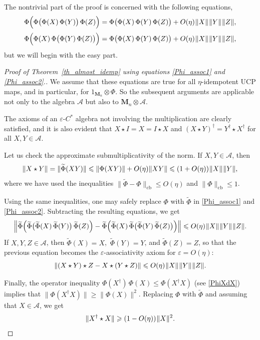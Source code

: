 \documentclass[12pt]{article}
\newcommand{\calA}{\mathcal{A}}
\newcommand{\ts}{\mkern1mu}
\newcommand{\cb}{\mathrm{cb}}
\newcommand{\wt}{\widetilde}
\newcommand*{\Ma}[1]{\mathbf{M}_{#1}}
\newcommand{\eps}{\varepsilon}
\renewcommand{\le}{\leqslant}
\renewcommand{\ge}{\geqslant}
\newtheorem[definition]{Definition}[Theorem]{Definition}
\newtheorem[remark]{Example}[Theorem]{Example}
\newtheorem[remark]{Remark}[Theorem]{Remark}
\newtheorem[remark]{Question}[Theorem]{Open question}
\newtheorem*[definition]{definition}{Definition}
\newtheorem*[remark]{example}{Example}
\newtheorem*[remark]{remark}{Remark}
\newtheorem*[remark]{question}{Open question}
\numberwithin{equation}{section}
\begin{document}
The nontrivial part of the proof is concerned with the following equations,
\begin{align}
\label{Phi_assoc1}
\Phi\Bigl(\Phi\bigl(\Phi(X)\,\Phi(Y)\bigr)\,\Phi(Z)\Bigr)
&=\Phi\bigl(\Phi(X)\,\Phi(Y)\,\Phi(Z)\bigr)+O(\eta)\ts\|X\|\ts\|Y\|\ts\|Z\|,
\\[2pt]
\label{Phi_assoc2}
\Phi\Bigl(\Phi(X)\,\Phi\bigl(\Phi(Y)\,\Phi(Z)\bigr)\Bigr)
&=\Phi\bigl(\Phi(X)\,\Phi(Y)\,\Phi(Z)\bigr)+O(\eta)\ts\|X\|\ts\|Y\|\ts\|Z\|,
\end{align}
but we will begin with the easy part.

\begin{proof}[Proof of Theorem~\ref{th_almost_idemp} using equations \eqref{Phi_assoc1} and \eqref{Phi_assoc2}.]
We assume that these equations are true for all $\eta$-idempotent UCP maps, and in particular, for $1_{\Ma{n}}\otimes\Phi$. So the subsequent arguments are applicable not only to the algebra $\calA$ but also to $\Ma{n}\otimes\calA$.

The axioms of an $\eps$-$C^*$ algebra not involving the multiplication are clearly satisfied, and it is also evident that $X\star I=X=I\star X$ and $(X\star Y)^\dag=Y^\dag\star X^\dag$ for all $X,Y\in\calA$.

Let us check the approximate submultiplicativity of the norm. If $X,Y\in\calA$, then
\begin{equation}
\|X\star Y\| =\|\wt{\Phi}(XY)\| \le\|\Phi(XY)\|+O(\eta)\|XY\|
\le (1+O(\eta))\ts\|X\|\ts\|Y\|,
\end{equation}
where we have used the inequalities $\|\wt{\Phi}-\Phi\|_\cb\le O(\eta)$ and $\|\Phi\|_\cb\le 1$.

Using the same inequalities, one may safely replace $\Phi$ with $\wt{\Phi}$ in \eqref{Phi_assoc1} and \eqref{Phi_assoc2}. Subtracting the resulting equations, we get
\[
\Bigl\|\wt{\Phi}\Bigl(\wt{\Phi}\bigl(\wt{\Phi}(X)\,\wt{\Phi}(Y)\bigr)\,
\wt{\Phi}(Z)\Bigr)
-\wt{\Phi}\Bigl(\wt{\Phi}(X)\,\wt{\Phi}\bigl(\wt{\Phi}(Y)\,
\wt{\Phi}(Z)\bigr)\Bigr)\Bigr\|
\le O(\eta)\ts\|X\|\ts\|Y\|\ts\|Z\|.
\]
If $X,Y,Z\in\calA$, then $\wt{\Phi}(X)=X$,\, $\wt{\Phi}(Y)=Y$, and $\wt{\Phi}(Z)=Z$, so that the previous equation becomes the $\eps$-associativity axiom for $\eps=O(\eta)$:
\begin{equation}
\|(X\star Y)\star Z-X\star (Y\star Z)\| \le O(\eta)\ts\|X\|\ts\|Y\|\ts\|Z\|.
\end{equation}

Finally, the operator inequality $\Phi(X^\dag)\,\Phi(X)\le\Phi(X^\dag X)$ (see \eqref{PhiXdX}) implies that $\|\Phi(X^\dag X)\|\ge\|\Phi(X)\|^2$. Replacing $\Phi$ with $\wt{\Phi}$ and assuming that $X\in\calA$, we get
\begin{equation}
\|X^\dag\star X\|\ge (1-O(\eta))\ts\|X\|^2.
\end{equation}
\end{proof}
\end{document}

